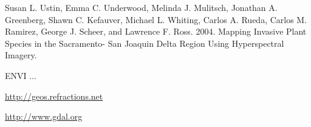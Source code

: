 \documentclass{elsart}
\begin{document}
\begin{thebibliography}{}


	
	Susan L. Ustin, Emma C. Underwood, Melinda
	J. Mulitsch, Jonathan A. Greenberg, Shawn C. Kefauver, Michael L.
	Whiting, Carlos A. Rueda, Carlos M. Ramirez, George J. Scheer, and Lawrence
	F. Ross. 2004.
	Mapping Invasive Plant Species in the Sacramento- San Joaquin Delta Region
	Using Hyperspectral Imagery.
	

	
	ENVI ... 	

	
	\url{http://geos.refractions.net}	

	
	\url{http://www.gdal.org}	

\end{thebibliography}
\end{document}
